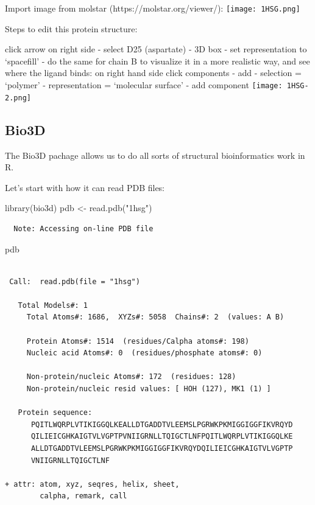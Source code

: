 \documentclass[
  letterpaper,
  DIV=11,
  numbers=noendperiod]{scrartcl}
\newenvironment{Shaded}{\begin{snugshade}}{\end{snugshade}}
\newcommand{\FunctionTok}[1]{\textcolor[rgb]{0.28,0.35,0.67}{#1}}
\newcommand{\NormalTok}[1]{\textcolor[rgb]{0.00,0.23,0.31}{#1}}
\newcommand{\OtherTok}[1]{\textcolor[rgb]{0.00,0.23,0.31}{#1}}
\newcommand{\StringTok}[1]{\textcolor[rgb]{0.13,0.47,0.30}{#1}}
\begin{document}
Import image from molstar (https://molstar.org/viewer/):
\texttt{[image: 1HSG.png]}

Steps to edit this protein structure:

click arrow on right side - select D25 (aspartate) - 3D box - set
representation to `spacefill' - do the same for chain B to visualize it
in a more realistic way, and see where the ligand binds: on right hand
side click components - add - selection = `polymer' - representation =
`molecular surface' - add component \texttt{[image: 1HSG-2.png]}

\subsection{Bio3D}\label{bio3d}

The Bio3D pachage allows us to do all sorts of structural bioinformatics
work in R.

Let's start with how it can read PDB files:

\begin{Shaded}
\begin{Highlighting}[]
\FunctionTok{library}\NormalTok{(bio3d)}
\NormalTok{pdb }\OtherTok{\textless{}{-}} \FunctionTok{read.pdb}\NormalTok{(}\StringTok{"1hsg"}\NormalTok{)}
\end{Highlighting}
\end{Shaded}

\begin{verbatim}
  Note: Accessing on-line PDB file
\end{verbatim}

\begin{Shaded}
\begin{Highlighting}[]
\NormalTok{pdb}
\end{Highlighting}
\end{Shaded}

\begin{verbatim}

 Call:  read.pdb(file = "1hsg")

   Total Models#: 1
     Total Atoms#: 1686,  XYZs#: 5058  Chains#: 2  (values: A B)

     Protein Atoms#: 1514  (residues/Calpha atoms#: 198)
     Nucleic acid Atoms#: 0  (residues/phosphate atoms#: 0)

     Non-protein/nucleic Atoms#: 172  (residues: 128)
     Non-protein/nucleic resid values: [ HOH (127), MK1 (1) ]

   Protein sequence:
      PQITLWQRPLVTIKIGGQLKEALLDTGADDTVLEEMSLPGRWKPKMIGGIGGFIKVRQYD
      QILIEICGHKAIGTVLVGPTPVNIIGRNLLTQIGCTLNFPQITLWQRPLVTIKIGGQLKE
      ALLDTGADDTVLEEMSLPGRWKPKMIGGIGGFIKVRQYDQILIEICGHKAIGTVLVGPTP
      VNIIGRNLLTQIGCTLNF

+ attr: atom, xyz, seqres, helix, sheet,
        calpha, remark, call
\end{verbatim}
\end{document}
